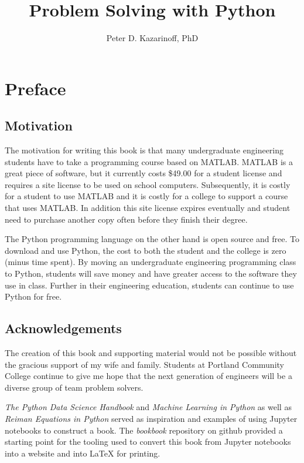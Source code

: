 \documentclass{book}
\title{Problem Solving with Python}
\author{Peter D. Kazarinoff, PhD}
\date{}
\begin{document}
    
    
    
    \maketitle
    
    
    \tableofcontents


    
    \chapter{Preface}\label{preface}

    \section{Motivation}\label{motivation}

    The motivation for writing this book is that many undergraduate
engineering students have to take a programming course based on MATLAB.
MATLAB is a great piece of software, but it currently costs \$49.00 for
a student license and requires a site license to be used on school
computers. Subsequently, it is costly for a student to use MATLAB and it
is costly for a college to support a course that uses MATLAB. In
addition this site license expires eventually and student need to
purchase another copy often before they finish their degree.

The Python programming language on the other hand is open source and
free. To download and use Python, the cost to both the student and the
college is zero (minus time spent). By moving an undergraduate
engineering programming class to Python, students will save money and
have greater access to the software they use in class. Further in their
engineering education, students can continue to use Python for free.

    \section{Acknowledgements}\label{acknowledgements}

    The creation of this book and supporting material would not be possible
without the gracious support of my wife and family. Students at Portland
Community College continue to give me hope that the next generation of
engineers will be a diverse group of team problem solvers.

\emph{The Python Data Science Handbook} and \emph{Machine Learning in
Python} as well as \emph{Reiman Equations in Python} served as
inspiration and examples of using Jupyter notebooks to construct a book.
The \emph{bookbook} repository on github provided a starting point for
the tooling used to convert this book from Jupyter notebooks into a
website and into LaTeX for printing.
\end{document}
